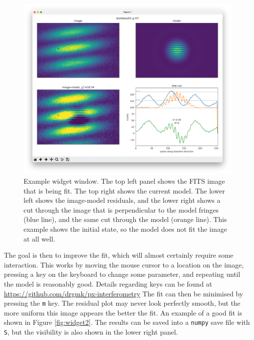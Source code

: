 \documentclass[11pt]{article}
\begin{document}
\begin{figure}
    \centering
    \includegraphics[width=1\textwidth]{widget.png}
    \caption{Example widget window. The top left panel shows the FITS image that is being fit. The top right shows the current model. The lower left shows the image-model residuals, and the lower right shows a cut through the image that is perpendicular to the model fringes (blue line), and the same cut through the model (orange line). This example shows the initial state, so the model does not fit the image at all well.}
    \label{fig:widget}
\end{figure}

The goal is then to improve the fit, which will almost certainly require some interaction. This works by moving the mouse cursor to a location on the image, pressing a key on the keyboard to change some parameter, and repeating until the model is reasonably good. Details regarding keys can be found at \href{https://github.com/drgmk/px-interferometry}{https://github.com/drgmk/px-interferometry} The fit can then be minimised by pressing the \texttt{m} key. The residual plot may never look perfectly smooth, but the more uniform this image appears the better the fit. An example of a good fit is shown in Figure \ref{fig:widget2}. The results can be saved into a \texttt{numpy} save file with \texttt{S}, but the visibility is also shown in the lower right panel.
\end{document}
